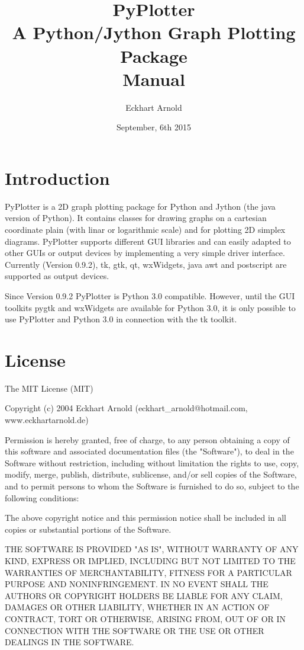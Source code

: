 \documentclass[12pt,a4paper,USenglish]{article}
\begin{document}
\title{PyPlotter\\A Python/Jython Graph Plotting Package\\Manual}
\author{Eckhart Arnold}
\date{September, 6th 2015}

\maketitle

\tableofcontents{}


\section{Introduction}

{\sf PyPlotter} is a 2D graph plotting package for Python and Jython
(the java version of Python). It contains classes for drawing graphs
on a cartesian coordinate plain (with linar or logarithmic scale) and
for plotting 2D simplex diagrams. {\sf PyPlotter} supports different
GUI libraries and can easily adapted to other GUIs or output devices
by implementing a very simple driver interface. Currently (Version
0.9.2), tk, gtk, qt, wxWidgets, java awt and postscript are supported as
output devices.

Since Version 0.9.2 PyPlotter is Python 3.0 compatible. However, until 
the GUI toolkits pygtk and wxWidgets are available for Python 3.0, it is
only possible to use PyPlotter and Python 3.0 in connection with the tk 
toolkit.

\section{License }

The MIT License (MIT)

Copyright (c) 2004 Eckhart Arnold (eckhart\_arnold@hotmail.com, www.eckhartarnold.de)

Permission is hereby granted, free of charge, to any person obtaining a copy
of this software and associated documentation files (the "Software"), to deal
in the Software without restriction, including without limitation the rights
to use, copy, modify, merge, publish, distribute, sublicense, and/or sell
copies of the Software, and to permit persons to whom the Software is
furnished to do so, subject to the following conditions:

The above copyright notice and this permission notice shall be included in
all copies or substantial portions of the Software.

THE SOFTWARE IS PROVIDED "AS IS", WITHOUT WARRANTY OF ANY KIND, EXPRESS OR
IMPLIED, INCLUDING BUT NOT LIMITED TO THE WARRANTIES OF MERCHANTABILITY,
FITNESS FOR A PARTICULAR PURPOSE AND NONINFRINGEMENT. IN NO EVENT SHALL THE
AUTHORS OR COPYRIGHT HOLDERS BE LIABLE FOR ANY CLAIM, DAMAGES OR OTHER
LIABILITY, WHETHER IN AN ACTION OF CONTRACT, TORT OR OTHERWISE, ARISING FROM,
OUT OF OR IN CONNECTION WITH THE SOFTWARE OR THE USE OR OTHER DEALINGS IN
THE SOFTWARE.
\end{document}
